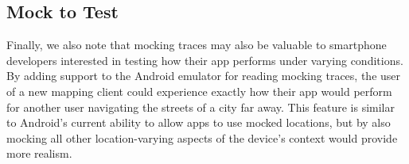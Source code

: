 \subsection{Mock to Test}

Finally, we also note that mocking traces may also be valuable to smartphone
developers interested in testing how their app performs under varying
conditions. By adding support to the Android emulator for reading mocking
traces, the user of a new mapping client could experience exactly how their
app would perform for another user navigating the streets of a city far away.
This feature is similar to Android's current ability to allow apps to use
mocked locations, but by also mocking all other location-varying aspects of
the device's context \PocketMocker{} would provide more realism.
